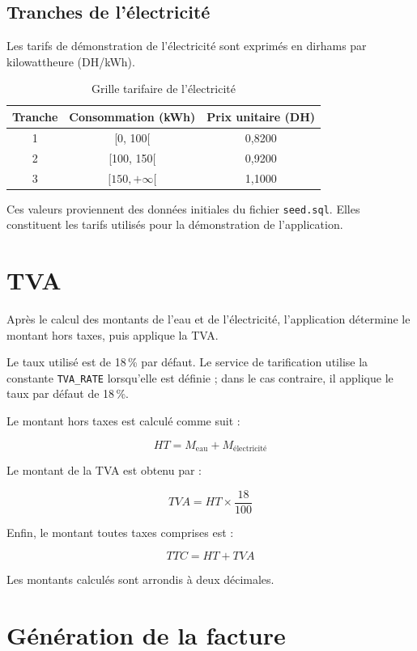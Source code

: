 \subsection{Tranches de l'électricité}

Les tarifs de démonstration de l'électricité sont exprimés en dirhams par kilowattheure (DH/kWh).

\begin{table}[H]
\centering
\caption{Grille tarifaire de l'électricité}
\begin{tabular}{ccc}
\toprule
\textbf{Tranche} & \textbf{Consommation (kWh)} & \textbf{Prix unitaire (DH)} \\
\midrule
1 & [0, 100[ & 0,8200 \\
2 & [100, 150[ & 0,9200 \\
3 & $[150,+\infty[$ & 1,1000 \\
\bottomrule
\end{tabular}
\end{table}

Ces valeurs proviennent des données initiales du fichier \texttt{seed.sql}. Elles constituent les tarifs utilisés pour la démonstration de l'application.

\section{TVA}

Après le calcul des montants de l'eau et de l'électricité, l'application détermine le montant hors taxes, puis applique la TVA.

Le taux utilisé est de 18\,\% par défaut. Le service de tarification utilise la constante \texttt{TVA\_RATE} lorsqu'elle est définie ; dans le cas contraire, il applique le taux par défaut de 18\,\%.

Le montant hors taxes est calculé comme suit :

\[
HT = M_{\text{eau}} + M_{\text{électricité}}
\]

Le montant de la TVA est obtenu par :

\[
TVA = HT \times \frac{18}{100}
\]

Enfin, le montant toutes taxes comprises est :

\[
TTC = HT + TVA
\]

Les montants calculés sont arrondis à deux décimales.

\section{Génération de la facture}

